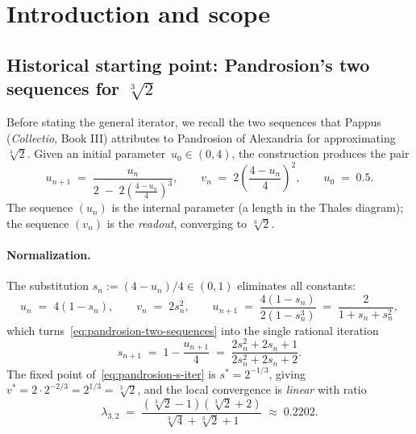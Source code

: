 \documentclass[11pt,a4paper]{article}
\theoremstyle{definition}
\theoremstyle{remark}
\begin{document}
\tableofcontents
\newpage

\section{Introduction and scope}
\label{sec:intro}

\subsection{Historical starting point: Pandrosion's two sequences for $\sqrt[3]{2}$}
\label{sec:historical}

Before stating the general iterator, we recall the two sequences that
Pappus (\textit{Collectio}, Book III) attributes to Pandrosion of
Alexandria for approximating~$\sqrt[3]{2}$. Given an initial
parameter~$u_0 \in (0, 4)$, the construction produces the pair
\begin{equation}\label{eq:pandrosion-two-sequences}
  u_{n+1} \;=\; \frac{u_n}{\displaystyle 2 \;-\; 2\!\left(\frac{4 - u_n}{4}\right)^{\!3}},
  \qquad
  v_n \;=\; 2 \left(\frac{4 - u_n}{4}\right)^{\!2},
  \qquad
  u_0 \;=\; 0.5.
\end{equation}
The sequence $(u_n)$ is the internal parameter (a length in the Thales
diagram); the sequence $(v_n)$ is the \emph{readout}, converging to
$\sqrt[3]{2}$.

\paragraph{Normalization.} The substitution
$s_n := (4 - u_n)/4 \in (0,1)$ eliminates all constants:
\[
  u_n \;=\; 4(1 - s_n),
  \qquad
  v_n \;=\; 2 s_n^{2},
  \qquad
  u_{n+1} \;=\; \frac{4(1 - s_n)}{2(1 - s_n^{3})} \;=\; \frac{2}{1 + s_n + s_n^{2}},
\]
which turns~\eqref{eq:pandrosion-two-sequences} into the single rational
iteration
\begin{equation}\label{eq:pandrosion-s-iter}
  s_{n+1} \;=\; 1 - \frac{u_{n+1}}{4}
          \;=\; \frac{2 s_n^{2} + 2 s_n + 1}{2 s_n^{2} + 2 s_n + 2}.
\end{equation}
The fixed point of~\eqref{eq:pandrosion-s-iter} is $s^\ast = 2^{-1/3}$,
giving $v^\ast = 2 \cdot 2^{-2/3} = 2^{1/3} = \sqrt[3]{2}$, and the local
convergence is \emph{linear} with ratio
\[
  \lambda_{3,2}
  \;=\; \frac{(\sqrt[3]{2} - 1)(\sqrt[3]{2} + 2)}{\sqrt[3]{4} + \sqrt[3]{2} + 1}
  \;\approx\; 0.2202.
\]
\end{document}
